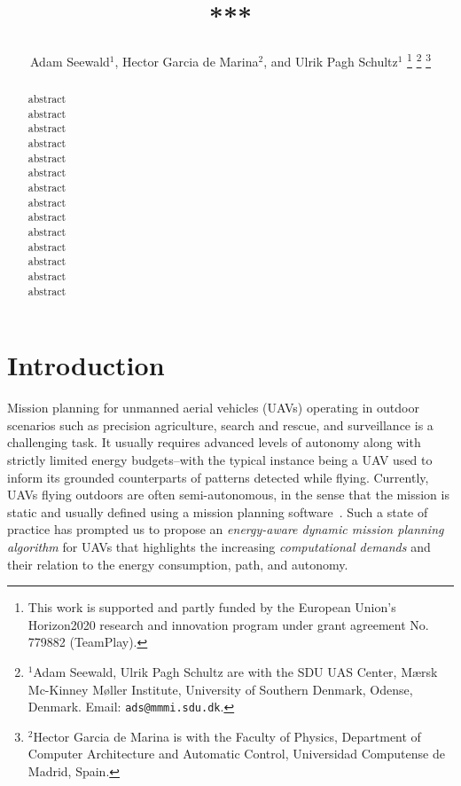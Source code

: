 \documentclass[letterpaper,10pt,conference]{ieeeconf}
\title{\LARGE \bf
***
}
\author{
  Adam Seewald$^{1}$, Hector Garcia de Marina$^{2}$, and Ulrik Pagh Schultz$^{1}$
  \thanks{This work is supported and partly funded by the European Union's Horizon2020 research and innovation program under grant agreement No. 779882 (TeamPlay).
  }
  \thanks{$^{1}$Adam Seewald, Ulrik Pagh Schultz are with the SDU UAS Center, M{\ae}rsk Mc-Kinney M{\o}ller Institute, University of Southern Denmark, Odense, Denmark. Email: {\tt\small ads@mmmi.sdu.dk}.}
  \thanks{$^{2}$Hector Garcia de Marina is with the Faculty of Physics, Department of Computer Architecture and Automatic Control, Universidad Computense de Madrid, Spain.}
}
\begin{document}
\maketitle

\thispagestyle{empty}
\pagestyle{empty}

\begin{abstract}

  abstract\\
  abstract\\
  abstract\\
  abstract\\
  abstract\\
  abstract\\
  abstract\\
  abstract\\
  abstract\\
  abstract\\
  abstract\\
  abstract\\
  abstract\\
  abstract
\end{abstract}

%
\IEEEpeerreviewmaketitle


\section{Introduction}
\label{sec:intro}


Mission planning for unmanned aerial vehicles (UAVs) operating in outdoor scenarios such as precision agriculture, search and rescue, and surveillance is a challenging task. It usually requires advanced levels of autonomy along with strictly limited energy budgets--with the typical instance being a UAV used to inform its grounded counterparts of patterns detected while flying. Currently, UAVs flying outdoors are often semi-autonomous, in the sense that the mission is static and usually defined using a mission planning software~\cite{daponte2019review}. Such a state of practice has prompted us to propose an \emph{energy-aware dynamic mission planning algorithm} for UAVs that highlights the increasing \emph{computational demands} and their relation to the energy consumption, path, and autonomy.
\end{document}
